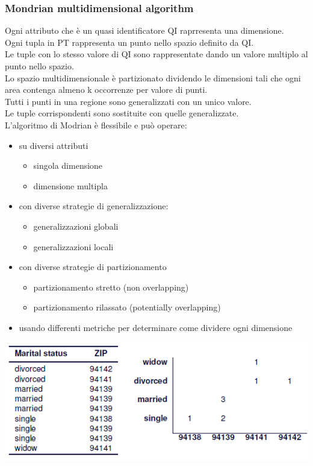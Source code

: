 \subsubsection{Mondrian multidimensional algorithm}
Ogni attributo che è un quasi identificatore QI raprresenta una dimensione.\\
Ogni tupla in PT rappresenta un punto nello spazio definito da QI.\\
Le tuple con lo stesso valore di QI sono rappresentate dando un valore multiplo al punto nello spazio.\\
Lo spazio multidimensionale è partizionato dividendo le dimensioni tali che ogni area contenga almeno k occorrenze per valore di punti.\\
Tutti i punti in una regione sono generalizzati con un unico valore.\\
Le tuple corrispondenti sono sostituite con quelle generalizzate.\\
L'algoritmo di Modrian è flessibile e può operare:
\begin{itemize}
    \item su diversi attributi
    \begin{itemize}
        \item singola dimensione
        \item dimensione multipla
    \end{itemize}
    
    \item con diverse strategie di generalizzazione:
    \begin{itemize}
        \item generalizzazioni globali
        \item generalizzazioni locali
    \end{itemize}
    
    \item con diverse strategie di partizionamento
    \begin{itemize}
        \item partizionamento stretto (non overlapping)
        \item partizionamento rilassato (potentially overlapping)
    \end{itemize}
    
    \item usando differenti metriche per determinare come dividere ogni dimensione
\end{itemize}
\begin{center}
    \includegraphics[scale=0.6]{img/modrian1.png}
\end{center}
